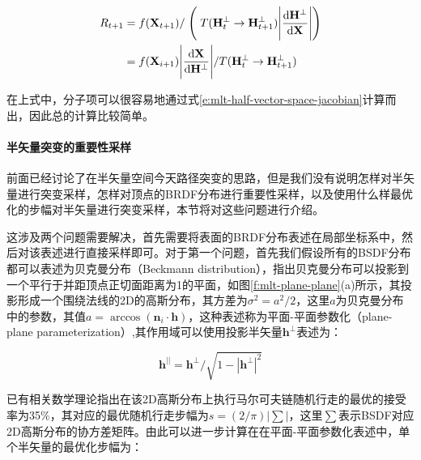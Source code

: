 \begin{equation}
\begin{aligned}
	R_{t+1}&=f(\mathbf{X}_{t+1})/\Biggm(T(\mathbf{H}^{\perp}_t\to\mathbf{H}^{\perp}_{t+1})\Biggl|\frac{{\rm d}\mathbf{H}^{\perp}}{{\rm d}\mathbf{X}}\Biggl|\Biggm)\\
	&=f(\mathbf{X}_{i+1})\Biggl|\frac{{\rm d}\mathbf{X}}{{\rm d}\mathbf{H}^{\perp}}\Biggl|/T(\mathbf{H}^{\perp}_t\to\mathbf{H}^{\perp}_{t+1})
\end{aligned}
\end{equation}

\noindent 在上式中，分子项可以很容易地通过式\ref{e:mlt-half-vector-space-jacobian}计算而出，因此总的计算比较简单。





\paragraph{半矢量突变的重要性采样}
前面已经讨论了在半矢量空间今天路径突变的思路，但是我们没有说明怎样对半矢量进行突变采样，怎样对顶点的BRDF分布进行重要性采样，以及使用什么样最优化的步幅对半矢量进行突变采样，本节将对这些问题进行介绍。

这涉及两个问题需要解决，首先需要将表面的BRDF分布表述在局部坐标系中，然后对该表述进行直接采样即可。对于第一个问题，首先我们假设所有的BSDF分布都可以表述为贝克曼分布（Beckmann distribution）\cite{a:Bidirectionalalightcuts}，\cite{b:TheScatteringofElectromagneticWavesFromRoughSurfaces,a:AReflectanceModelforComputerGraphics}指出贝克曼分布可以投影到一个平行于并距顶点正切面距离为1的平面，如图\ref{f:mlt-plane-plane}(a)所示，其投影形成一个围绕法线的2D的高斯分布，其方差为$\sigma^{2}=a^{2}/2$，这里$a$为贝克曼分布中的参数，其值$a=\arccos(\mathbf{n}_i\cdot\mathbf{h})$，这种表述称为平面-平面参数化（plane-plane parameterization）,其作用域可以使用投影半矢量$\mathbf{h}^{\perp}$表述为：

\begin{equation}\label{e:mlt-parallel-half-vector}
	\mathbf{h}^{||}=\mathbf{h}^{\perp}/\sqrt{1-|\mathbf{h}^{\perp}|^{2}}
\end{equation}

\noindent 已有相关数学理论\cite{b:MarkovChains:GibbsFieldsMonteCarloSimulationandQueues}指出在该2D高斯分布上执行马尔可夫链随机行走的最优的接受率为35\%，其对应的最优随机行走步幅为$s=(2/\pi)|\sum|$，这里$\sum$表示BSDF对应2D高斯分布的协方差矩阵。由此可以进一步计算在在平面-平面参数化表述中，单个半矢量的最优化步幅为：

